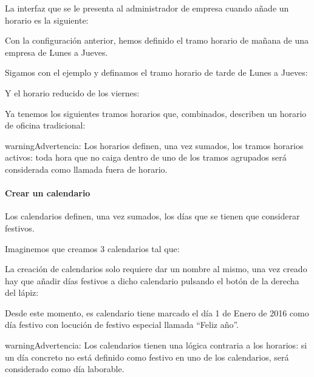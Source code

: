 \documentclass[letterpaper,10pt,spanish]{sphinxmanual}
\begin{document}
La interfaz que se le presenta al administrador de empresa cuando añade un horario es la siguiente:

\noindent{}

Con la configuración anterior, hemos definido el tramo horario de mañana de una empresa de Lunes a Jueves.

Sigamos con el ejemplo y definamos el tramo horario de tarde de Lunes a Jueves:

\noindent{}

Y el horario reducido de los viernes:

\noindent{}

Ya tenemos los siguientes tramos horarios que, combinados, describen un horario de oficina tradicional:

\noindent{}

\begin{notice}{warning}{Advertencia:}
Los horarios definen, una vez sumados, los tramos horarios activos: toda hora que no caiga dentro de uno de los tramos agrupados será considerada como llamada fuera de horario.
\end{notice}
\paragraph{Crear un calendario}

Los calendarios definen, una vez sumados, los días que se tienen que considerar festivos.

Imaginemos que creamos 3 calendarios tal que:

\noindent{}

La creación de calendarios solo requiere dar un nombre al mismo, una vez creado hay que añadir días festivos a dicho calendario pulsando el botón de la derecha del lápiz:

\noindent{}

Desde este momento, es calendario tiene marcado el día 1 de Enero de 2016 como día festivo con locución de festivo especial llamada ``Feliz año''.

\begin{notice}{warning}{Advertencia:}
Los calendarios tienen una lógica contraria a los horarios: si un día concreto no está definido como festivo en uno de los calendarios, será considerado como día laborable.
\end{notice}
\end{document}
